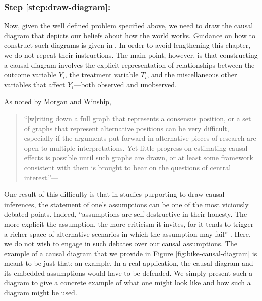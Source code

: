 \subsubsection*{Step \ref{step:draw-diagram}:}
Now, given the well defined problem specified above, we need to draw the causal diagram that depicts our beliefs about how the world works. Guidance on how to construct such diagrams is given in \citep{pearl_1995_causal, greenland_1999_causal, elwert_2014_endogenous, morgan2015counterfactuals}. In order to avoid lengthening this chapter, we do not repeat their instructions. The main point, however, is that constructing a causal diagram involves the explicit representation of relationships between the outcome variable $Y_i$, the treatment variable $T_i$, and the miscellaneous other variables that affect $Y_i$---both observed and unobserved.

As noted by Morgan and Winship,
\begin{quotation}
``[w]riting down a full graph that represents a consensus position, or a set of graphs that represent alternative positions can be very difficult, especially if the arguments put forward in alternative pieces of research are open to multiple interpretations. Yet little progress on estimating causal effects is possible until such graphs are drawn, or at least some framework consistent with them is brought to bear on the questions of central interest.''---\citep[pg.~33]{morgan2015counterfactuals}
\end{quotation}
One result of this difficulty is that in studies purporting to draw causal inferences, the statement of one's assumptions can be one of the most viciously debated points. Indeed, ``assumptions are self-destructive in their honesty. The more explicit the assumption, the more criticism it invites, for it tends to trigger a richer space of alternative scenarios in which the assumption may fail'' \citep[~pg. 580]{pearl_2014_external}. Here, we do not wish to engage in such debates over our causal assumptions. The example of a causal diagram that we provide in Figure \ref{fig:bike-causal-diagram} is meant to be just that: an example. In a real application, the causal diagram and its embedded assumptions would have to be defended. We simply present such a diagram to give a concrete example of what one might look like and how such a diagram might be used.

